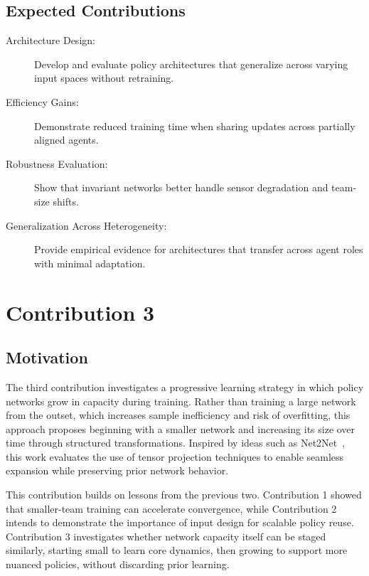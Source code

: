 \subsection{Expected Contributions}
\begin{description}
    \item[Architecture Design:] Develop and evaluate policy architectures that 
        generalize across varying input spaces without retraining.
    \item[Efficiency Gains:] Demonstrate reduced training time when sharing 
        updates across partially aligned agents.
    \item[Robustness Evaluation:] Show that invariant networks better handle 
        sensor degradation and team-size shifts.
    \item[Generalization Across Heterogeneity:] Provide empirical evidence 
        for architectures that transfer across agent roles with minimal adaptation.
\end{description}


\section{Contribution 3}

\subsection{Motivation}
The third contribution investigates a progressive learning strategy in which policy 
networks grow in capacity during training. Rather than training a large network 
from the outset, which increases sample inefficiency and risk of overfitting, 
this approach proposes beginning with a smaller network and increasing its size over 
time through structured transformations. Inspired by ideas such as Net2Net~\cite{chen2016}, 
this work evaluates the use of tensor projection techniques to enable seamless 
expansion while preserving prior network behavior.

This contribution builds on lessons from the previous two. Contribution 1 
showed that smaller-team training can accelerate convergence, while Contribution 2 
intends to demonstrate the importance of input design for scalable policy reuse. 
Contribution 3 investigates whether network capacity itself can be staged similarly,
starting small to learn core dynamics, then growing to support more nuanced policies,
without discarding prior learning.

